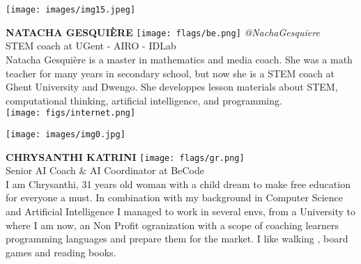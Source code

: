 \noindent
\begin{minipage}{0.3\textwidth}
\centering
\texttt{[image: images/img15.jpeg]}
\end{minipage}
\hfill
\begin{minipage}{0.6\textwidth}\raggedright
\color{color1}\uppercase{\textbf{Natacha Gesquière}}
\color{color2}\hspace{0.2cm}\texttt{[image: flags/be.png]}
\hspace{0.2cm}\textit{@NachaGesquiere}
\\
STEM coach at UGent - AIRO - IDLab \\
{\footnotesize Natacha Gesquière is a master in mathematics and media coach. She was a math teacher for many years in secondary school, but now she is a STEM coach at Ghent University and Dwengo. She developpes lesson materials about STEM, computational thinking, artificial intelligence, and programming. }\\
\texttt{[image: figs/internet.png]}
\end{minipage}
\newline\newline\newline

\noindent
\begin{minipage}{0.3\textwidth}
\centering
\texttt{[image: images/img0.jpg]}
\end{minipage}
\hfill
\begin{minipage}{0.6\textwidth}\raggedright
\color{color1}\uppercase{\textbf{Chrysanthi Katrini}}
\color{color2}\hspace{0.2cm}\texttt{[image: flags/gr.png]}
\\
Senior AI Coach \& AI Coordinator at BeCode\\
{\footnotesize I am Chrysanthi, 31 years old woman with a child dream to make free education for everyone a must. In combination with my background in Computer Science and Artificial Intelligence I managed to work in several envs, from a University to where I am now, an Non Profit ogranization with a scope of coaching learners programming languages and prepare them for the market. I like walking , board games and reading books. }\\
\end{minipage}
\newline\newline\newline

